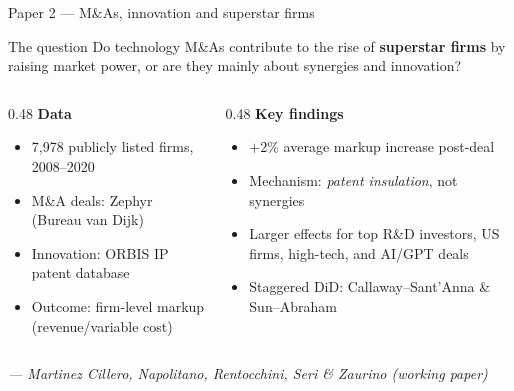 \documentclass[aspectratio=169, 10pt]{beamer}
\begin{document}
\begin{frame}{Paper 2 — M\&As, innovation and superstar firms}

  \begin{block}{The question}
    Do technology M\&As contribute to the rise of \textbf{superstar firms} by
    raising market power, or are they mainly about synergies and innovation?
  \end{block}

  \medskip
  \begin{columns}[T]
    \begin{column}{0.48\textwidth}
      \textbf{Data}
      \begin{itemize}
        \item 7{,}978 publicly listed firms, 2008--2020
        \item M\&A deals: Zephyr (Bureau van Dijk)
        \item Innovation: ORBIS IP patent database
        \item Outcome: firm-level markup (revenue/variable cost)
      \end{itemize}
    \end{column}
    \begin{column}{0.48\textwidth}
      \textbf{Key findings}
      \begin{itemize}
        \item $+2\%$ average markup increase post-deal
        \item Mechanism: \emph{patent insulation}, not synergies
        \item Larger effects for top R\&D investors, US firms,
              high-tech, and AI/GPT deals
        \item Staggered DiD: Callaway--Sant'Anna \& Sun--Abraham
      \end{itemize}
    \end{column}
  \end{columns}

  \medskip
  \small\textit{\citet{rentocchini2025superstar} --- Martinez Cillero,
    Napolitano, Rentocchini, Seri \& Zaurino (working paper)}

\end{frame}
\end{document}
